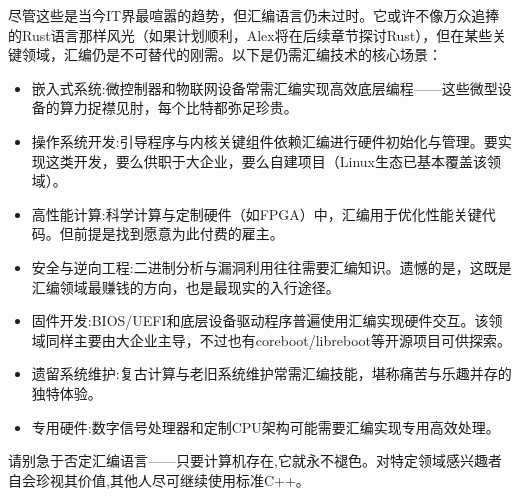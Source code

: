 尽管这些是当今IT界最喧嚣的趋势，但汇编语言仍未过时。它或许不像万众追捧的Rust语言那样风光（如果计划顺利，Alex将在后续章节探讨Rust），但在某些关键领域，汇编仍是不可替代的刚需。以下是仍需汇编技术的核心场景：

\begin{itemize}
\item 
嵌入式系统:微控制器和物联网设备常需汇编实现高效底层编程——这些微型设备的算力捉襟见肘，每个比特都弥足珍贵。

\item 
操作系统开发:引导程序与内核关键组件依赖汇编进行硬件初始化与管理。要实现这类开发，要么供职于大企业，要么自建项目（Linux生态已基本覆盖该领域）。

\item 
高性能计算:科学计算与定制硬件（如FPGA）中，汇编用于优化性能关键代码。但前提是找到愿意为此付费的雇主。

\item 
安全与逆向工程:二进制分析与漏洞利用往往需要汇编知识。遗憾的是，这既是汇编领域最赚钱的方向，也是最现实的入行途径。

\item 
固件开发:BIOS/UEFI和底层设备驱动程序普遍使用汇编实现硬件交互。该领域同样主要由大企业主导，不过也有coreboot/libreboot等开源项目可供探索。

\item 
遗留系统维护:复古计算与老旧系统维护常需汇编技能，堪称痛苦与乐趣并存的独特体验。

\item 
专用硬件:数字信号处理器和定制CPU架构可能需要汇编实现专用高效处理。
\end{itemize}

请别急于否定汇编语言——只要计算机存在,它就永不褪色。对特定领域感兴趣者自会珍视其价值,其他人尽可继续使用标准C++。

